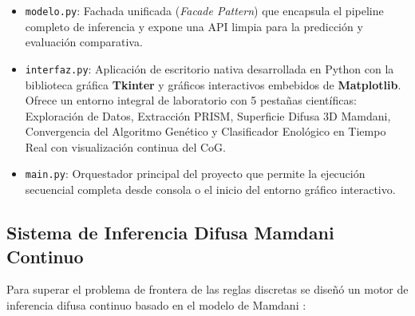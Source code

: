 \documentclass{article}
\begin{document}
\begin{itemize}
    \item \texttt{modelo.py}: Fachada unificada (\textit{Facade Pattern}) que encapsula el pipeline completo de inferencia y expone una API limpia para la predicción y evaluación comparativa.
    \item \texttt{interfaz.py}: Aplicación de escritorio nativa desarrollada en Python con la biblioteca gráfica \textbf{Tkinter} y gráficos interactivos embebidos de \textbf{Matplotlib}. Ofrece un entorno integral de laboratorio con 5 pestañas científicas: Exploración de Datos, Extracción PRISM, Superficie Difusa 3D Mamdani, Convergencia del Algoritmo Genético y Clasificador Enológico en Tiempo Real con visualización continua del CoG.
    \item \texttt{main.py}: Orquestador principal del proyecto que permite la ejecución secuencial completa desde consola o el inicio del entorno gráfico interactivo.
\end{itemize}

\subsection{Sistema de Inferencia Difusa Mamdani Continuo}

Para superar el problema de frontera de las reglas discretas se diseñó un motor de inferencia difusa continuo basado en el modelo de Mamdani \cite{mamdani1975experiment}:
\end{document}
